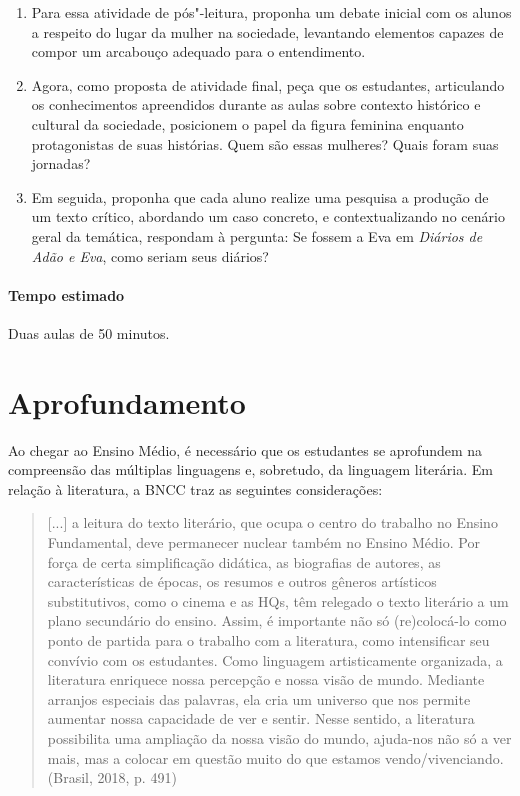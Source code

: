 \documentclass[12pt]{extarticle}
\begin{document}
\begin{enumerate}
\item
Para essa atividade de pós"-leitura, proponha um debate inicial com os
alunos a respeito do lugar da mulher na sociedade, levantando elementos capazes 
de compor um arcabouço adequado para o entendimento.

\item
Agora, como proposta de atividade final, peça que os estudantes, articulando
os conhecimentos apreendidos durante as aulas sobre contexto histórico e cultural
da sociedade, posicionem o papel da figura feminina enquanto protagonistas de suas 
histórias. Quem são essas mulheres? Quais foram suas jornadas? 

\item
Em seguida, proponha que cada aluno realize uma pesquisa a produção de um texto crítico, 
abordando um caso concreto, e contextualizando no cenário geral da temática, respondam à 
pergunta: 
Se fossem a Eva em \emph{Diários de Adão e Eva}, como seriam seus diários?

\end{enumerate}

\paragraph{Tempo estimado} Duas aulas de 50 minutos. 

\section{Aprofundamento}

Ao chegar ao Ensino Médio, é necessário que os estudantes se aprofundem
na compreensão das múltiplas linguagens e, sobretudo, da linguagem
literária. Em relação à literatura, a BNCC traz as seguintes
considerações:

\begin{quote}
{[}...{]} a leitura do texto literário, que ocupa o centro do trabalho
no Ensino Fundamental, deve permanecer nuclear também no Ensino Médio.
Por força de certa simplificação didática, as biografias de autores, as
características de épocas, os resumos e outros gêneros artísticos
substitutivos, como o cinema e as HQs, têm relegado o texto literário a
um plano secundário do ensino. Assim, é importante não só (re)colocá-lo
como ponto de partida para o trabalho com a literatura, como
intensificar seu convívio com os estudantes. Como linguagem
artisticamente organizada, a literatura enriquece nossa percepção e
nossa visão de mundo. Mediante arranjos especiais das palavras, ela cria
um universo que nos permite aumentar nossa capacidade de ver e sentir.
Nesse sentido, a literatura possibilita uma ampliação da nossa visão do
mundo, ajuda-nos não só a ver mais, mas a colocar em questão muito do
que estamos vendo/vivenciando. (Brasil, 2018, p. 491)
\end{quote}
\end{document}

